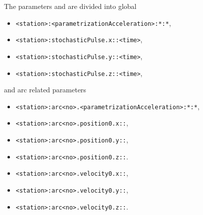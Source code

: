 The parameters and  are divided into global
\begin{itemize}
\item \verb|<station>:<parametrizationAcceleration>:*:*|,
\item \verb|<station>:stochasticPulse.x::<time>|,
\item \verb|<station>:stochasticPulse.y::<time>|,
\item \verb|<station>:stochasticPulse.z::<time>|,
\end{itemize}
and arc related parameters
\begin{itemize}
\item \verb|<station>:arc<no>.<parametrizationAcceleration>:*:*|,
\item \verb|<station>:arc<no>.position0.x::|,
\item \verb|<station>:arc<no>.position0.y::|,
\item \verb|<station>:arc<no>.position0.z::|.
\item \verb|<station>:arc<no>.velocity0.x::|,
\item \verb|<station>:arc<no>.velocity0.y::|,
\item \verb|<station>:arc<no>.velocity0.z::|.
\end{itemize}


